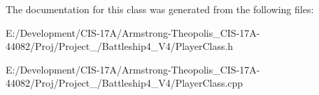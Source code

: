The documentation for this class was generated from the following files\+:\begin{DoxyCompactItemize}
\item 
E\+:/\+Development/\+C\+I\+S-\/17\+A/\+Armstrong-\/\+Theopolis\+\_\+\+C\+I\+S-\/17\+A-\/44082/\+Proj/\+Project\+\_/\+Battleship4\+\_\+\+V4/Player\+Class.\+h\item 
E\+:/\+Development/\+C\+I\+S-\/17\+A/\+Armstrong-\/\+Theopolis\+\_\+\+C\+I\+S-\/17\+A-\/44082/\+Proj/\+Project\+\_/\+Battleship4\+\_\+\+V4/Player\+Class.\+cpp\end{DoxyCompactItemize}
